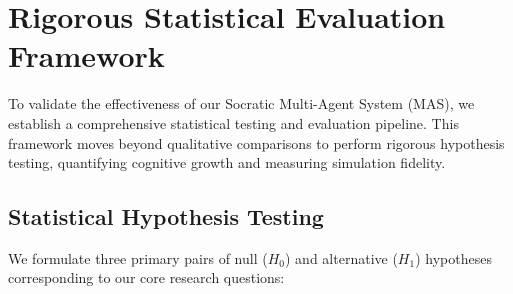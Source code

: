 \section{Rigorous Statistical Evaluation Framework}
To validate the effectiveness of our Socratic Multi-Agent System (MAS), we establish a comprehensive statistical testing and evaluation pipeline. This framework moves beyond qualitative comparisons to perform rigorous hypothesis testing, quantifying cognitive growth and measuring simulation fidelity.

\subsection{Statistical Hypothesis Testing}
We formulate three primary pairs of null ($H_0$) and alternative ($H_1$) hypotheses corresponding to our core research questions:

